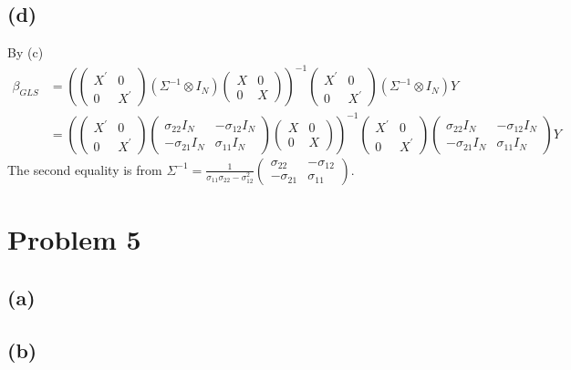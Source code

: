 \documentclass{article}
\begin{document}
\subsection{(d)}
By (c)
\begin{align*}
	\beta_{GLS} &= \left(\left(\begin{array}{cc} X^{'} & 0 \\ 0 & X^{'} \end{array}\right) \left(\Sigma^{-1} \otimes I_N \right) \left(\begin{array}{cc} X & 0 \\ 0 & X \end{array}\right)\right)^{-1} \left(\begin{array}{cc} X^{'} & 0 \\ 0 & X^{'} \end{array}\right) \left(\Sigma^{-1} \otimes I_N \right) Y\\[8pt]
	&= \left(\left(\begin{array}{cc} X^{'} & 0 \\ 0 & X^{'} \end{array}\right) \left(\begin{array}{cc} \sigma_{22}I_N & -\sigma_{12}I_N \\ -\sigma_{21} I_N & \sigma_{11} I_N \end{array}\right) \left(\begin{array}{cc} X & 0 \\ 0 & X \end{array}\right)\right)^{-1} \left(\begin{array}{cc} X^{'} & 0 \\ 0 & X^{'} \end{array}\right) \left(\begin{array}{cc} \sigma_{22}I_N & -\sigma_{12}I_N \\ -\sigma_{21} I_N & \sigma_{11} I_N \end{array}\right) Y
\end{align*}
The second equality is from $\Sigma^{-1} = \frac{1}{\sigma_{11}\sigma_{22} - \sigma_{12}^2}\left( \begin{array}{cc} \sigma_{22} & -\sigma_{12} \\ -\sigma_{21} & \sigma_{11} \end{array} \right)$.


\section{Problem 5}
\subsection{(a)}
\subsection{(b)}
\end{document}
